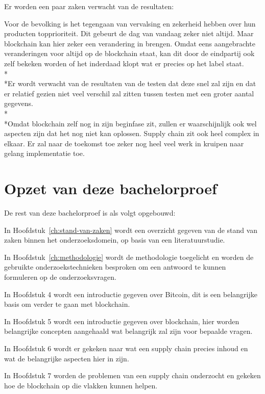 Er worden een paar zaken verwacht van de resultaten:

Voor de bevolking is het tegengaan van vervalsing en zekerheid hebben over hun producten topprioriteit. Dit gebeurt de dag van vandaag zeker niet altijd. Maar blockchain kan hier zeker een verandering in brengen. Omdat eens aangebrachte veranderingen voor altijd op de blockchain staat, kan dit door de eindpartij ook zelf bekeken worden of het inderdaad klopt wat er precies op het label staat.\\*\\*Er wordt verwacht van de resultaten van de testen dat deze snel zal zijn en dat er relatief gezien niet veel verschil zal zitten tussen testen met een groter aantal gegevens.\\*\\*Omdat blockchain zelf nog in zijn beginfase zit, zullen er waarschijnlijk ook wel aspecten zijn dat het nog niet kan oplossen. Supply chain zit ook heel complex in elkaar. Er zal naar de toekomst toe zeker nog heel veel werk in kruipen naar gelang implementatie toe.

\section{Opzet van deze bachelorproef}
\label{sec:opzet-bachelorproef}

De rest van deze bachelorproef is als volgt opgebouwd:

In Hoofdstuk~\ref{ch:stand-van-zaken} wordt een overzicht gegeven van de stand van zaken binnen het onderzoeksdomein, op basis van een literatuurstudie.

In Hoofdstuk~\ref{ch:methodologie} wordt de methodologie toegelicht en worden de gebruikte onderzoekstechnieken besproken om een antwoord te kunnen formuleren op de onderzoeksvragen.

In Hoofdstuk 4 wordt een introductie gegeven over Bitcoin, dit is een belangrijke basis om verder te gaan met blockchain.

In Hoofdstuk 5 wordt een introductie gegeven over blockchain, hier worden belangrijke concepten aangehaald wat belangrijk zal zijn voor bepaalde vragen.

In Hoofdstuk 6 wordt er gekeken naar wat een supply chain precies inhoud en wat de belangrijke aspecten hier in zijn.

In Hoofdstuk 7 worden de problemen van een supply chain onderzocht en gekeken hoe de blockchain op die vlakken kunnen helpen.

